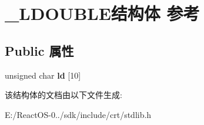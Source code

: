 \hypertarget{struct___l_d_o_u_b_l_e}{}\section{\+\_\+\+L\+D\+O\+U\+B\+L\+E结构体 参考}
\label{struct___l_d_o_u_b_l_e}
\subsection*{Public 属性}
\begin{DoxyCompactItemize}
\item 
\mbox{\label{struct___l_d_o_u_b_l_e_ac22d5d0f1791437271b89484a258de0b}} 
unsigned char {\bfseries ld} \mbox{[}10\mbox{]}
\end{DoxyCompactItemize}


该结构体的文档由以下文件生成\+:\begin{DoxyCompactItemize}
\item 
E\+:/\+React\+O\+S-\/0../sdk/include/crt/stdlib.\+h\end{DoxyCompactItemize}
